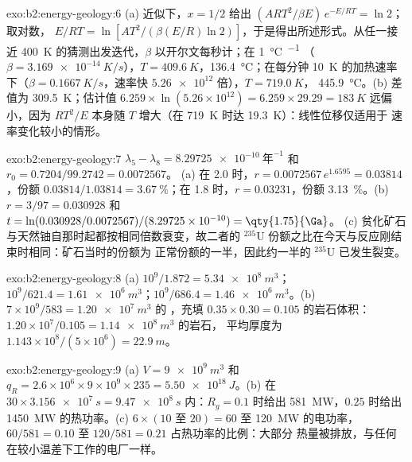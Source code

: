 \begin{solution}{exo:b2:energy-geology:6}
(a) 近似下，$x = 1/2$ 给出 $(ART^2/\beta E)\,e^{-E/RT} = \ln 2$；取对数，
$E/RT = \ln[AT^2/(\beta(E/R)\ln 2)]$，于是得出所述形式。从任一接近
\qty{400}{K} 的猜测出发迭代，$\beta$ 以开尔文每秒计；在 \qty{1}{\celsius\per\Ma}
（$\beta = \qty{3.169e-14}{K/s}$），$T = \qty{409.6}{K}$，\qty{136.4}{\celsius}；在每分钟 \qty{10}{K}
的加热速率下（$\beta = \qty{0.1667}{K/s}$，速率快 $\num{5.26e12}$ 倍），$T = \qty{719.0}{K}$，
\qty{445.9}{\celsius}。(b) 差值为 \qty{309.5}{K}；估计值 $6.259 \times
\ln(5.26 \times 10^{12}) = 6.259 \times 29.29 = \qty{183}{K}$ 远偏小，因为 $RT^2/E$
本身随 $T$ 增大（在 \qty{719}{K} 时达 \qty{19.3}{K}）：线性位移仅适用于
速率变化较小的情形。
\end{solution}

\begin{solution}{exo:b2:energy-geology:7}
$\lambda_5 - \lambda_8 = \qty{8.29725e-10}{\text{年}^{-1}}$ 和 $r_0 = 0.7204/99.2742 = 0.0072567$。
(a) 在 \qty{2.0}{\Ga} 时，$r = 0.0072567\,e^{1.6595} = 0.03814$，份额 $0.03814/1.03814 =
\qty{3.67}{\percent}$；在 \qty{1.8}{\Ga} 时，$r = 0.03231$，份额 \qty{3.13}{\percent}。(b) $r =
3/97 = 0.030928$ 和 $t = \ln(0.030928/0.0072567)/(8.29725 \times 10^{-10}) = \qty{1.75}{\Ga}$。
(c) 贫化矿石与天然铀自那时起都按相同倍数衰变，故二者的
$^{235}$U 份额之比在今天与反应刚结束时相同：矿石当时的份额为
正常份额的一半，因此约一半的 $^{235}$U 已发生裂变。
\end{solution}

\begin{solution}{exo:b2:energy-geology:8}
(a) $10^9/1.872 = \qty{5.34e8}{m^3}$；$10^9/621.4 = \qty{1.61e6}{m^3}$；$10^9/686.4 =
\qty{1.46e6}{m^3}$。(b) $7 \times 10^9/583 = \qty{1.20e7}{m^3}$ 的 ，充填
$0.35 \times 0.30 = 0.105$ 的岩石体积：$1.20 \times 10^7/0.105 = \qty{1.14e8}{m^3}$ 的岩石，
平均厚度为 $1.143 \times 10^8/(5 \times 10^6) = \qty{22.9}{m}$。
\end{solution}

\begin{solution}{exo:b2:energy-geology:9}
(a) $V = \qty{9e9}{m^3}$ 和 $q_R = 2.6 \times 10^6 \times 9 \times 10^9 \times 235 =
\qty{5.50e18}{J}$。(b) 在 $30 \times \qty{3.156e7}{s} = \qty{9.47e8}{s}$ 内：$R_g = 0.1$ 时给出
\qty{581}{MW}，$0.25$ 时给出 \qty{1450}{MW} 的热功率。(c) $6 \times (10 \text{ 至 } 20) = 60$ 至
\qty{120}{MW} 的电功率，$60/581 = 0.10$ 至 $120/581 = 0.21$ 占热功率的比例：大部分
热量被排放，与任何在较小温差下工作的电厂一样。
\end{solution}

